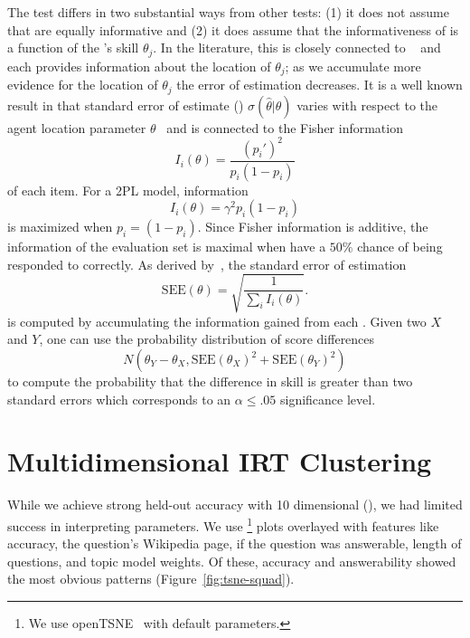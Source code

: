 The \irt{} test differs in two substantial ways from other tests: (1) it does not assume that \itms{} are equally informative and (2) it does assume that the informativeness of \itms{} is a function of the \subj{}'s skill $\theta_j$.
In the literature, this is closely connected to ~\citep{sutcliffe1992pragmatics} and each \itm{} provides information about the location of $\theta_j$; as we accumulate more evidence for the location of $\theta_j$ the error of estimation decreases.
It is a well known result in \irt{} that standard error of estimate () $\sigma(\hat{\theta}|\theta)$ varies with respect to the agent location parameter $\theta$~\citep[p.~30]{theory2013ayala} and is connected to the Fisher information
\begin{equation}
  I_i(\theta)=\frac{(p_i')^2}{p_i(1-p_i)}
\end{equation}
of each item.
For a 2PL model, information
\begin{equation}
  I_i(\theta)=\gamma^2p_i(1-p_i)
\end{equation}
is maximized when $p_i=(1-p_i)$.
Since Fisher information is additive, the information of the evaluation set is maximal when \itms{} have a $50\%$ chance of being responded to correctly.
As derived by~\citet[p.~102]{theory2013ayala}, the standard error of estimation
\begin{equation}
  \text{SEE}(\theta)=\sqrt{\frac{1}{\sum_i I_i(\theta)}}.
\end{equation}
is computed by accumulating the information gained from each \itm{}.
Given two \subjs{} $X$ and $Y$, one can use the probability distribution of score differences
\begin{equation}
  N(\theta_Y-\theta_X, \text{SEE}(\theta_X)^2+\text{SEE}(\theta_Y)^2)
\end{equation}
to compute the probability that the difference in skill is greater than two standard errors which corresponds to an $\alpha\le .05$ significance level.

\section{Multidimensional IRT Clustering}
\label{ch:isicle:clustering}

While we achieve strong held-out accuracy with 10 dimensional \irt{} (), we had limited success in interpreting parameters.
We use \footnote{
  We use openTSNE~\citep{policar2019tsne} with default parameters.
} plots overlayed with features like \itm{} accuracy, the question's Wikipedia page, if the question was answerable, length of questions, and topic model weights.
Of these, \itm{} accuracy and answerability showed the most obvious patterns (Figure~\ref{fig:tsne-squad}).

